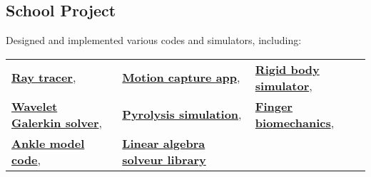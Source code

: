 \documentclass[letterpaper]{twentysecondcv} %
\begin{document}

\subsection{School Project}

\setlength\tabcolsep{0pt}

Designed and implemented various codes and simulators, including:
\\
\begin{tabular*}{\linewidth}{@{\extracolsep{\fill}} lll }
\href{https://github.com/ArthurGouing/Shader}  {\textbf{Ray tracer}}, & 
\href{https://github.com/ArthurGouing/SIA} {\textbf{Motion capture app}}, & 
\href{https://github.com/ArthurGouing/Meca_3D}{\textbf{Rigid body simulator}}, \\
\href{https://drive.google.com/file/d/1TlY18PySk2Y6PfQx1AX2zp2NOW02hIMp/view?usp=drive_link} {\textbf{Wavelet Galerkin solver}}, &
\href{https://drive.google.com/file/d/17Ait0Ps1EPSk32GV3WXzE-T5U_s8E46L/view?usp=drive_link} {\textbf{Pyrolysis simulation}}, & 
\href{https://drive.google.com/file/d/1kUdH7PGXiABPJj4z1XhYOHIH0S54tEfc/view?usp=drive_link} {\textbf{Finger biomechanics}}, \\
\href{https://drive.google.com/file/d/1Hen1em0Q5E2-icFI5EIw6yr95lXx_FuE/view?usp=drive_link} {\textbf{Ankle model code}}, &
\href{https://drive.google.com/file/d/1OPkFyc6Cv98JciyZxQHiEn_65DEc-XBS/view?usp=drive_link} {\textbf{Linear algebra solveur library}} & 
\end{tabular*}
\end{document}
